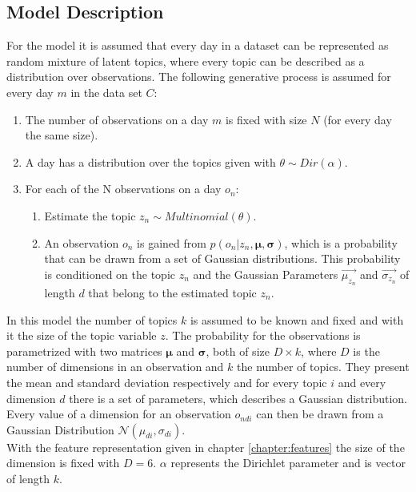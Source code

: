 
\subsection{Model Description}
  
  For the model it is assumed that every day in a dataset can be represented as random mixture of latent topics, where every topic can be described as a distribution over observations. The following generative process is assumed for every day $m$ in the data set $C$:
\begin{enumerate}
 \item The number of observations on a day $m$ is fixed with size $N$ (for every day the same size).
 \item A day has a distribution over the topics given with $\theta \sim Dir(\alpha)$.
 \item For each of the N observations on a day $o_n$:
 
 \begin{enumerate}
  \item Estimate the topic $z_n \sim Multinomial(\theta)$.
  \item An observation $o_n$ is gained from $p(o_n |z_n,\boldsymbol\mu,\boldsymbol\sigma)$,  which is a probability that can be drawn from a set of Gaussian distributions. This probability is conditioned on the topic $z_n$ and the Gaussian Parameters $\vec{\mu_{z_n}}$ and $\vec{\sigma_{z_n}}$ of length $d$ that belong to the estimated topic $z_n$.
 \end{enumerate}

\end{enumerate}
  
In this model the number of topics $k$ is assumed to be known and fixed and with it the size of the topic variable $z$.
The probability for the observations is parametrized with two matrices $\boldsymbol\mu$ and $\boldsymbol\sigma$, both of size $D\times k$, where $D$ is the number of dimensions in an observation and $k$ the number of topics. They present the mean and standard deviation respectively and for every topic $i$ and every dimension $d$ there is a set of parameters, which describes a Gaussian distribution. Every value of a dimension for an observation $o_{ndi}$ can then be drawn from a Gaussian Distribution $\mathcal{N}(\mu_{di},\sigma_{di})$.\\
With the feature representation given in chapter \ref{chapter:features} the size of the dimension is fixed with $D=6$. $\alpha$ represents the Dirichlet parameter and is vector of length $k$.

